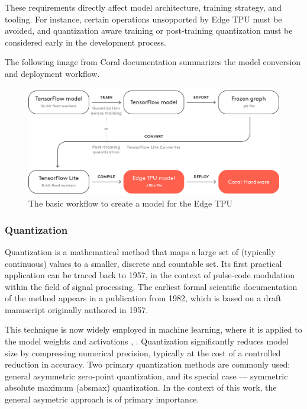 {These requirements directly affect model architecture, training strategy, and tooling. For instance, certain operations unsopported by Edge TPU must be avoided, and quantization aware training or post-training quantization must be considered early in the development process.

The following image from Coral documentation summarizes the model conversion and deployment workflow.

\begin{figure}[H]
  \centering
  \includegraphics[width=\textwidth]{files/Edge_TPU_quantization.png}
  \caption{The basic workflow to create a model for the Edge TPU}
  \label{fig:quantization-chart}
\end{figure}

\subsubsection{Quantization}

Quantization is a mathematical method that maps a large set of (typically continuous) values to a smaller, discrete and countable set. Its first practical application can be traced back to 1957, in the context of pulse-code modulation within the field of signal processing. The earliest formal scientific documentation of the method appears in a publication from 1982, which is based on a draft manuscript originally authored in 1957. \cite{firstQuantization}

This technique is now widely employed in machine learning, where it is applied to the model weights and activations \cite{MLQuantization1}, \cite{MLQuantization2}. Quantization significantly reduces model size by compressing numerical precision, typically at the cost of a controlled reduction in accuracy. Two primary quantization methods are commonly used: general asymmetric zero-point quantization, and its special case --- symmetric absolute maximum (absmax) quantization. In the context of this work, the general asymetric approach is of primary importance.

}
